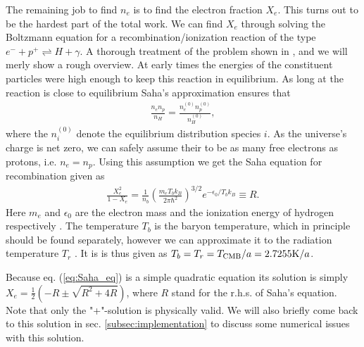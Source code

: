 \documentclass[twocolumn]{aastex62}
\begin{document}
The remaining job to find $n_e$ is to find the electron fraction $X_e$. This turns out to be the hardest part of the total work. We can find $X_e$ through solving the Boltzmann equation for a recombination/ionization reaction of the type $e^{-} + p^{+} \rightleftharpoons H + \gamma$. A thorough treatment of the problem shown in \cite{dodelson:2003}, and we will merly show a rough overview. At early times the energies of the constituent particles were high enough to keep this reaction in equilibrium. As long at the reaction is close to equilibrium Saha's approximation \citep[p. 70]{dodelson:2003} ensures that 
\begin{align}
    \frac{n_e n_p}{n_H} = \frac{n_e^{(0)}n_p^{(0)}}{n_H^{(0)}},
\end{align}
where the $n_i^{(0)}$ denote the equilibrium distribution species $i$. As the universe's charge is net zero, we can safely assume their to be as many free electrons as protons, i.e. $n_e = n_p$. Using this assumption we get the Saha equation for recombination given as 
\begin{align}
    \frac{X_e^2}{1 - X_e} = \frac{1}{n_b} \left(\frac{m_e
    T_bk_B}{2\pi\hbar^2}\right)^{3/2} e^{-\epsilon_0/T_bk_B} \equiv R.
    \label{eq:Saha_eq}
\end{align}
Here $m_e$ and $\epsilon_0$ are the electron mass and the ionization energy of hydrogen respectively \citep[]{winther:2020}. The temperature $T_b$ is the baryon temperature, which in principle should be found separately, however we can approximate it to the radiation temperature $T_r$ \citep[]{winther:2020}. It is is thus given as $T_b =
T_r = T_{\rm CMB} / a = 2.7255 \textrm{K} / a$.

Because eq. (\ref{eq:Saha_eq}) is a simple quadratic equation its solution is simply 
$X_e = \frac{1}{2} (-R \pm \sqrt{R^2 + 4R})$, where $R$ stand for the r.h.s. of Saha's equation. Note that only the "+"-solution is physically valid. We will also briefly come back to this solution in sec. \ref{subsec:implementation} to discuss some numerical issues with this solution.
\end{document}
